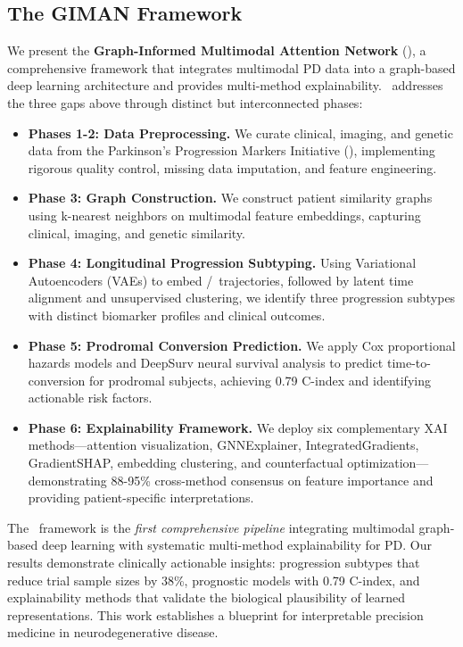 \subsection*{The GIMAN Framework}

We present the \textbf{Graph-Informed Multimodal Attention Network} (\giman), a comprehensive framework that integrates multimodal PD data into a graph-based deep learning architecture and provides multi-method explainability. \giman\ addresses the three gaps above through distinct but interconnected phases:

\begin{itemize}
    \item \textbf{Phases 1-2: Data Preprocessing.} We curate clinical, imaging, and genetic data from the Parkinson's Progression Markers Initiative (\ppmi)\cite{marek2018parkinson}, implementing rigorous quality control, missing data imputation, and feature engineering.
    
    \item \textbf{Phase 3: Graph Construction.} We construct patient similarity graphs using k-nearest neighbors on multimodal feature embeddings, capturing clinical, imaging, and genetic similarity.
    
    \item \textbf{Phase 4: Longitudinal Progression Subtyping.} Using Variational Autoencoders (VAEs) to embed \updrs/\moca\ trajectories, followed by latent time alignment and unsupervised clustering, we identify three progression subtypes with distinct biomarker profiles and clinical outcomes.
    
    \item \textbf{Phase 5: Prodromal Conversion Prediction.} We apply Cox proportional hazards models and DeepSurv neural survival analysis to predict time-to-conversion for prodromal subjects, achieving 0.79 C-index and identifying actionable risk factors.
    
    \item \textbf{Phase 6: Explainability Framework.} We deploy six complementary XAI methods—attention visualization, GNNExplainer, IntegratedGradients, GradientSHAP, embedding clustering, and counterfactual optimization—demonstrating 88-95\% cross-method consensus on feature importance and providing patient-specific interpretations.
\end{itemize}

The \giman\ framework is the \textit{first comprehensive pipeline} integrating multimodal graph-based deep learning with systematic multi-method explainability for PD. Our results demonstrate clinically actionable insights: progression subtypes that reduce trial sample sizes by 38\%, prognostic models with 0.79 C-index, and explainability methods that validate the biological plausibility of learned representations. This work establishes a blueprint for interpretable precision medicine in neurodegenerative disease.
